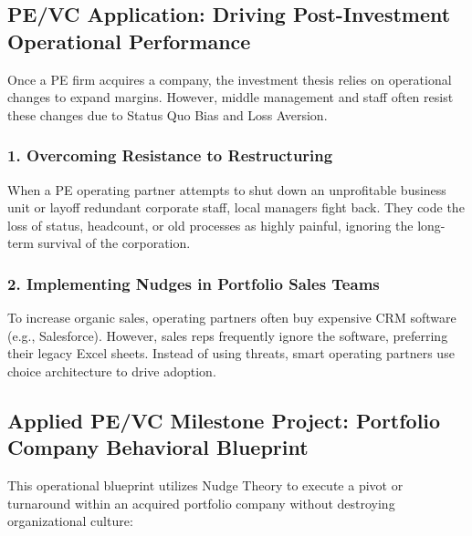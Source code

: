 \documentclass[11pt,a4paper]{article}
\begin{document}
\subsection{PE/VC Application: Driving Post-Investment Operational Performance}
Once a PE firm acquires a company, the investment thesis relies on operational changes to expand margins. However, middle management and staff often resist these changes due to Status Quo Bias and Loss Aversion.

\subsubsection{1. Overcoming Resistance to Restructuring}
When a PE operating partner attempts to shut down an unprofitable business unit or layoff redundant corporate staff, local managers fight back. They code the loss of status, headcount, or old processes as highly painful, ignoring the long-term survival of the corporation.

\subsubsection{2. Implementing Nudges in Portfolio Sales Teams}
To increase organic sales, operating partners often buy expensive CRM software (e.g., Salesforce). However, sales reps frequently ignore the software, preferring their legacy Excel sheets. Instead of using threats, smart operating partners use choice architecture to drive adoption.

\newpage
\subsection{Applied PE/VC Milestone Project: Portfolio Company Behavioral Blueprint}
This operational blueprint utilizes Nudge Theory to execute a pivot or turnaround within an acquired portfolio company without destroying organizational culture:
\end{document}
